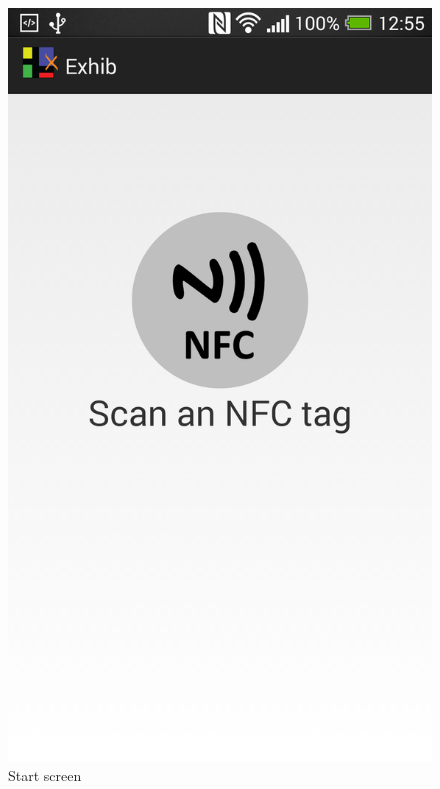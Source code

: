 \begin{figure}[H]
\begin{minipage}[b]{0.5\columnwidth}
\centering
\includegraphics[width=\columnwidth]{img/finaldesign/nfcscreen.png}
\caption{Start screen}
\label{fig:nfcscreen}
\end{minipage}
\hspace{0.5cm}
\begin{minipage}[b]{0.5\columnwidth}
\centering

\end{minipage}
\end{figure}
